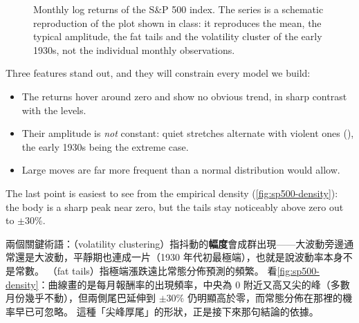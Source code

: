 \begin{figure}[H]
	\centering
	\caption{Monthly log returns of the S\&P 500 index. The series is a
		schematic reproduction of the plot shown in class: it reproduces the mean,
		the typical amplitude, the fat tails and the volatility cluster of the early
		1930s, not the individual monthly observations.}
	\label{fig:sp500-returns}
\end{figure}

\suppstart
Three features stand out, and they will constrain every model we build:

\begin{itemize}[nosep]
	\item The returns hover around zero and show no obvious trend, in sharp contrast with the levels.
	\item Their amplitude is \emph{not} constant: quiet stretches alternate with violent ones (), the early 1930s being the extreme case.
	\item Large moves are far more frequent than a normal distribution would allow.
\end{itemize}

The last point is easiest to see from the empirical density (\autoref{fig:sp500-density}): the body is a sharp peak near zero, but the tails stay noticeably above zero out to $\pm 30\%$.

\begin{remark}
	兩個關鍵術語：（volatility clustering）指抖動的\textbf{幅度}會成群出現——大波動旁邊通常還是大波動，平靜期也連成一片（1930 年代初最極端），也就是說波動率本身不是常數。
	（fat tails）指極端漲跌遠比常態分佈預測的頻繁。
	看\autoref{fig:sp500-density}：曲線畫的是每月報酬率的出現頻率，中央為 0 附近又高又尖的峰（多數月份幾乎不動），但兩側尾巴延伸到 $\pm 30\%$ 仍明顯高於零，而常態分佈在那裡的機率早已可忽略。
	這種「尖峰厚尾」的形狀，正是接下來那句結論的依據。
\end{remark}
\suppend

